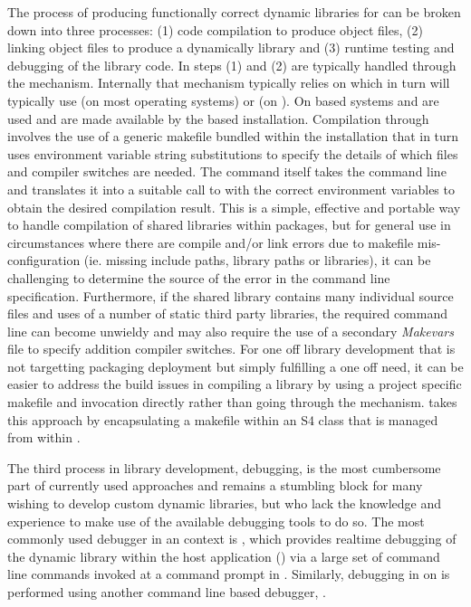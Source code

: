 The process of producing functionally correct dynamic libraries for  can be broken down into three processes: (1) code compilation to produce object files,
(2) linking object files to produce a dynamically library and (3) runtime testing and debugging of the library code. In  steps (1) and (2) 
are typically handled through the \citep{SHLIB} mechanism. Internally that mechanism typically relies on \citep{GnuMake} which 
in turn will typically use \citep{gcc} (on most operating systems) or \citep{LLVM} (on ). On  based systems  and 
are used and are made available by the  based  installation\citep{UsingRtools}. Compilation through  
involves the use of a generic makefile bundled within the  installation that in turn uses environment variable string substitutions to specify the details 
of which files and compiler switches are needed. The command itself takes the command line and translates it into a suitable call to  with the correct 
environment variables to obtain the desired compilation result. This is a simple, effective and portable way to handle compilation of shared 
libraries within  packages, but for general use in circumstances where there are compile and/or link errors due to makefile mis-configuration 
(ie. missing include paths, library paths or libraries), it can be challenging to determine the source of the error in the command line specification. Furthermore, 
if the shared library contains many individual source files and uses of a number of static third party libraries, the required command line can become 
unwieldy and may also require the use of a secondary \emph{Makevars} file to specify addition compiler switches. For one off library development that is not targetting
packaging deployment but simply fulfilling a one off need, it can be easier to address the build issues in compiling a library by using a project specific makefile 
and  invocation directly rather than going through the  mechanism.  takes this approach by encapsulating a makefile within 
an S4 class that is managed from within .

The third process in library development, debugging, is the most cumbersome part of currently used approaches and remains a stumbling 
block for many wishing to develop custom dynamic libraries, but who lack the knowledge and experience to make use of the available debugging 
tools to do so. The most commonly used debugger in an  context is \citep{GDB}, which provides realtime debugging of the dynamic library within the
host application () via a large set of command line commands invoked at a command prompt in . Similarly, debugging in  on  is performed using another 
command line based debugger, \citep{LLDB}. 


